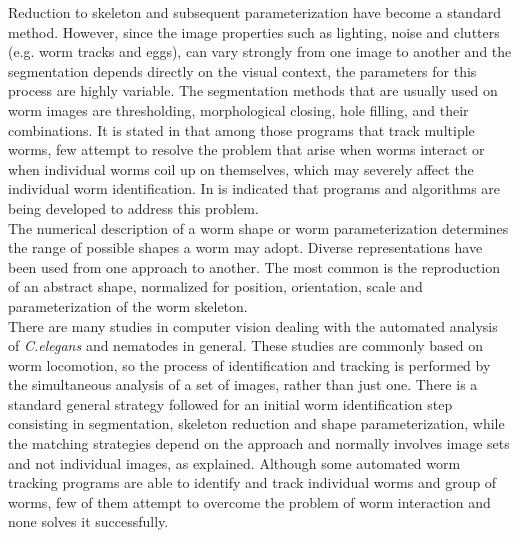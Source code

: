 Reduction to skeleton and subsequent parameterization have become a standard method. 
However, since the image properties such as lighting, noise and clutters 
(e.g. worm tracks and eggs), can vary strongly from one image to another and 
the segmentation depends directly on the visual context, the  
parameters for this process are highly variable. The segmentation methods 
that are usually used 
on worm images are thresholding, morphological closing, 
hole filling, and their combinations.
It is stated in \cite{automated} that among those programs that track 
multiple worms, few attempt to resolve the problem that arise when 
worms interact or when individual worms coil up on themselves, which may
severely affect the individual worm identification. In \cite{huang} is indicated
that programs and algorithms are being developed to address this problem.\\

The  numerical description of a worm shape or worm parameterization 
determines the range of possible shapes a worm may adopt. Diverse 
representations have been used from one approach to another. The 
most common is the reproduction of an abstract shape, normalized for position, 
orientation, scale and parameterization of the 
worm skeleton.\\

There are many studies in computer vision dealing with the automated
analysis of \emph{C.elegans} and nematodes in general. These studies are
commonly based on worm locomotion, so the process of identification and 
tracking is performed by the simultaneous analysis of a set of images, rather
than just one. There is a standard general strategy followed for an initial
worm identification step consisting in segmentation, skeleton reduction and
shape parameterization, while the matching strategies depend on the approach
and normally involves image sets and not individual images, as explained.
Although some automated worm tracking programs are able to identify and track
individual worms and group of worms, few of them attempt to overcome the 
problem of worm interaction and none solves it successfully.

